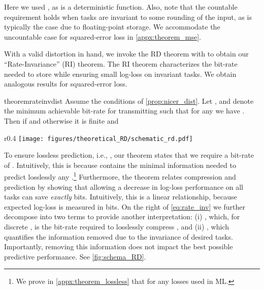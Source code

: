 \documentclass[final]{article}
\begin{document}
Here we used , as  is a deterministic function.  
Also, note that the countable requirement holds when tasks are invariant to some rounding of the input, as is typically the case due to floating-point storage.
We accommodate the uncountable case for squared-error loss in \cref{appx:theorem_mse}.

With a valid distortion in hand, we invoke the RD theorem with \disttextinv{} to obtain our ``Rate-Invariance'' (RI) theorem.
The RI theorem characterizes the bit-rate needed to store  while ensuring small log-loss on invariant tasks.
We obtain analogous results for squared-error loss.
\begin{restatable}{theorem}{rateinvdist}\label{thm:rate_invariance_distortion}
Assume the conditions of \cref{prop:nicer_dist}. 
Let , and  denote the minimum achievable bit-rate for transmitting  such that for any  we have .
Then  if  and otherwise it is finite and

\end{restatable}
\begin{wrapfigure}{r}{0.4\textwidth}
\vspace{-1\baselineskip}
 \centering
 \texttt{[image: figures/theoretical\_RD/schematic\_rd.pdf]}
 \vspace{-1\baselineskip}
 \caption{Rate-Invariance function.}
\label{fig:schema_RD}
\vspace{-1\baselineskip}
\end{wrapfigure}
 To ensure lossless prediction, i.e., , our theorem states that we require a bit-rate of .
Intuitively, this is because  contains the minimal information needed to predict losslessly any .\footnote{
We prove in \cref{appx:theorem_lossless} that  for any losses used in ML.
}
Furthermore, the theorem relates compression and prediction by showing that allowing a  decrease in log-loss performance on all tasks can save \textit{exactly}  bits. 
Intuitively, this is a linear relationship, because expected log-loss is measured in bits.
On the right of \cref{eq:rate_inv} we further decompose  into two terms to provide another interpretation:
(i) , which, for discrete , is the bit-rate required to losslessly compress , and (ii) , which quantifies the information removed due to the invariance of desired tasks.
Importantly, removing this information does not impact the best possible predictive performance.
See \cref{fig:schema_RD}.
\end{document}
